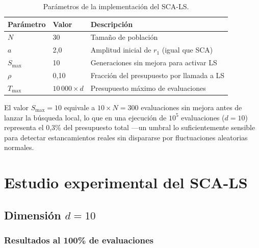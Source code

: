 \documentclass[12pt,a4paper]{article}
\begin{document}
\begin{table}[H]
\centering
\renewcommand{\arraystretch}{1.3}
\begin{tabular}{lll}
\toprule
\textbf{Parámetro} & \textbf{Valor} & \textbf{Descripción} \\
\midrule
$N$              & 30                  & Tamaño de población \\
$a$              & 2{,}0               & Amplitud inicial de $r_1$ (igual que SCA) \\
$S_{\max}$       & 10                  & Generaciones sin mejora para activar LS \\
$\rho$           & 0{,}10              & Fracción del presupuesto por llamada a LS \\
$T_{\max}$       & $10\,000 \times d$  & Presupuesto máximo de evaluaciones \\
\bottomrule
\end{tabular}
\caption{Parámetros de la implementación del SCA-LS.}
\label{tab:parametros_sca_ls}
\end{table}

El valor $S_{\max}=10$ equivale a $10 \times N = 300$ evaluaciones sin mejora antes de lanzar la búsqueda local, lo que en una ejecución de $10^5$ evaluaciones ($d=10$) representa el 0{,}3\% del presupuesto total ---un umbral lo suficientemente sensible para detectar estancamientos reales sin dispararse por fluctuaciones aleatorias normales.

\section{Estudio experimental del SCA-LS}
\label{sec:exp_sca_ls}

\subsection{Dimensión $d = 10$}

\subsubsection{Resultados al 100\% de evaluaciones}
\end{document}
